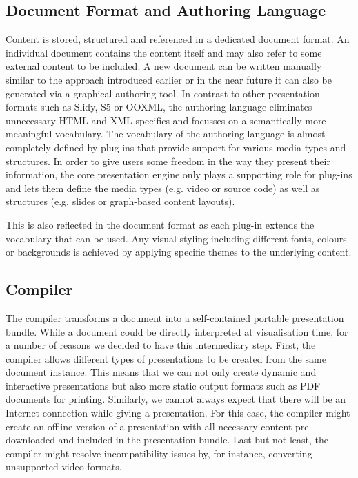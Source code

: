    \subsection{Document Format and Authoring Language}

    Content is stored, structured and referenced in a dedicated \mxp document
    format. An individual \mxp document contains the content itself and may
    also refer to some external content to be included. A new \mxp document can
    be written manually similar to the \latex approach introduced earlier or in
    the near future it can also be generated via a graphical authoring tool. In
    contrast to other presentation formats such as Slidy, S5 or OOXML, the
    authoring language eliminates unnecessary HTML and XML specifics and
    focusses on a semantically more meaningful vocabulary. The vocabulary of
    the authoring language is almost completely defined by plug-ins that
    provide support for various media types and structures. In order to give
    users some freedom in the way they present their information, the core \mxp
    presentation engine only plays a supporting role for plug-ins and lets them
    define the media types (e.g. video or source code) as well as structures
    (e.g. slides or graph-based content layouts).

    This is also reflected in the document format as each plug-in extends the
    vocabulary that can be used. Any visual styling including different fonts,
    colours or backgrounds is achieved by applying specific themes to the
    underlying content.

   \subsection{Compiler}

    The compiler transforms a \mxp document into a self-contained portable \mxp
    presentation bundle. While a \mxp document could be directly interpreted at
    visualisation time, for a number of reasons we decided to have this
    intermediary step. First, the compiler allows different types of
    presentations to be created from the same \mxp document instance. This
    means that we can not only create dynamic and interactive presentations but
    also more static output formats such as PDF documents for printing.
    Similarly, we cannot always expect that there will be an Internet
    connection while giving a presentation. For this case, the compiler might
    create an offline version of a presentation with all necessary content
    pre-downloaded and included in the \mxp presentation bundle.  Last but not
    least, the compiler might resolve incompatibility issues by, for instance,
    converting unsupported video formats.

